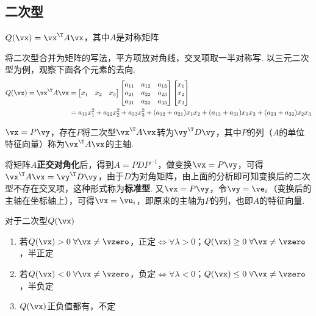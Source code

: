 \subsection{二次型}
\begin{definition}[二次型]
$Q(\vx)=\vx^\T A\vx$，其中$A$是对称矩阵
\end{definition}
将二次型合并为矩阵的写法，平方项放对角线，交叉项取一半对称写. 以三元二次型为例，观察下面各个元素的去向.
\[\begin{aligned}Q(\vx)=\vx^\T A\vx&=\begin{bmatrix}x_1&x_2&x_3\end{bmatrix}\begin{bmatrix}a_{11}&a_{12}&a_{13}\\a_{21}&a_{22}&a_{23}\\a_{31}&a_{32}&a_{33}\end{bmatrix}\begin{bmatrix}x_1\\x_2\\x_3\end{bmatrix}\\
&=a_{11}x_1^2+a_{22}x_2^2+a_{33}x_3^2+(a_{12}+a_{21})x_1x_2+(a_{13}+a_{31})x_1x_3+(a_{23}+a_{32})x_2x_3\end{aligned}\]
\begin{theorem}[主轴定理]
$\vx=P\vy$，存在$P$将二次型$\vx^\T A\vx$转为$\vy^\T D\vy$，其中$P$的列（$A$的单位特征向量）称为$\vx^\T A\vx$的主轴.
\end{theorem}
\begin{myalgorithm}[标准型变换]
将矩阵$A$\textbf{正交对角化}后，得到$A=PDP^{-1}$，做变换$\vx=P\vy$，可得$\vx^\T A\vx=\vy^\T D\vy$，由于$D$为对角矩阵，由上面的分析即可知变换后的二次型不存在交叉项，这种形式称为\textbf{标准型}. 又$\vx=P\vy$，令$\vy=\ve_i$（变换后的主轴在坐标轴上），可得$\vx=\vu_i$，即原来的主轴为$P$的列，也即$A$的特征向量.
\end{myalgorithm}
\begin{definition}
对于二次型$Q(\vx)$
\begin{enumerate}
	\itemsep -3pt
	\item 若$Q(\vx)>0\;\forall \vx\ne\vzero$，正定$\iff\forall\lambda>0$；$Q(\vx)\geq0\;\forall \vx\ne\vzero$，半正定
	\item 若$Q(\vx)<0\;\forall \vx\ne\vzero$，负定$\iff\forall\lambda<0$；$Q(\vx)\leq0\;\forall \vx\ne\vzero$，半负定
	\item $Q(\vx)$正负值都有，不定
\end{enumerate}
\end{definition}
